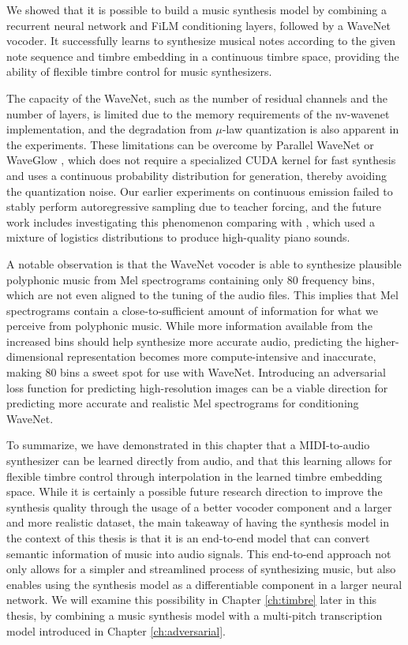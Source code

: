 We showed that it is possible to build a music synthesis model by combining a recurrent neural network and FiLM conditioning layers, followed by a WaveNet vocoder.
It successfully learns to synthesize musical notes according to the given note sequence and timbre embedding in a continuous timbre space, providing the ability of flexible timbre control for music synthesizers.

The capacity of the WaveNet, such as the number of residual channels and the number of layers, is limited due to the memory requirements of the nv-wavenet implementation, and the degradation from $\mu$-law quantization is also apparent in the experiments.
These limitations can be overcome by Parallel WaveNet \cite{oord2018parallel} or WaveGlow \cite{prenger2019waveglow}, which does not require a specialized CUDA kernel for fast synthesis and uses a continuous probability distribution for generation, thereby avoiding the quantization noise.
Our earlier experiments on continuous emission failed to stably perform autoregressive sampling due to teacher forcing, and the future work includes investigating this phenomenon comparing with \cite{hawthorne2019maestro}, which used a mixture of logistics distributions to produce high-quality piano sounds.

A notable observation is that the WaveNet vocoder is able to synthesize plausible polyphonic music from Mel spectrograms containing only 80 frequency bins, which are not even aligned to the tuning of the audio files.
This implies that Mel spectrograms contain a close-to-sufficient amount of information for what we perceive from polyphonic music.
While more information available from the increased bins should help synthesize more accurate audio, predicting the higher-dimensional representation becomes more compute-intensive and inaccurate, making 80 bins a sweet spot for use with WaveNet.
Introducing an adversarial loss function for predicting high-resolution images \cite{ledig2017superresolution} can be a viable direction for predicting more accurate and realistic Mel spectrograms for conditioning WaveNet.

To summarize, we have demonstrated in this chapter that a MIDI-to-audio synthesizer can be learned directly from audio, and that this learning allows for flexible timbre control through interpolation in the learned timbre embedding space.
While it is certainly a possible future research direction to improve the synthesis quality through the usage of a better vocoder component and a larger and more realistic dataset,
the main takeaway of having the synthesis model in the context of this thesis is that it is an end-to-end model that can convert semantic information of music into audio signals.
This end-to-end approach not only allows for a simpler and streamlined process of synthesizing music, but also enables using the synthesis model as a differentiable component in a larger neural network.
We will examine this possibility in Chapter \ref{ch:timbre} later in this thesis, by combining a music synthesis model with a multi-pitch transcription model introduced in Chapter \ref{ch:adversarial}.

